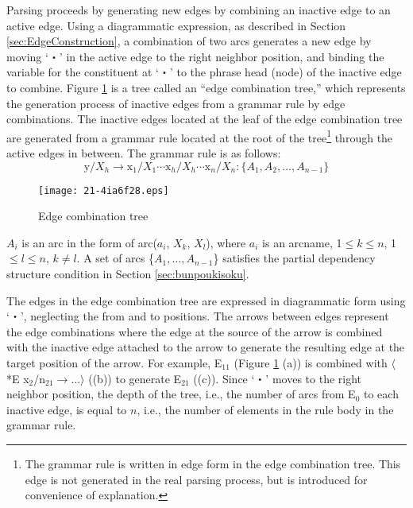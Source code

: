\documentclass[english]{jnlp_1.4_rep}
\theoremstyle{break}
\theoremstyle{plain}
\theoremstyle{plain}
\begin{document}
Parsing proceeds by generating new edges by combining an inactive edge
to an active edge. Using a diagrammatic expression, as described in
Section \ref{sec:EdgeConstruction}, a combination of two arcs
generates a new edge by moving `・' in the active edge to the right
neighbor position, and binding the variable for the constituent at `・'
to the phrase head (node) of the inactive edge to
combine. Figure \ref{fig:EdgeCombinationTree} is a tree called an ``edge
combination tree,'' which represents the generation process of
inactive edges from a grammar rule by edge combinations. The inactive
edges located at the leaf of the edge combination tree are generated
from a grammar rule located at the root of the tree\footnote{The
  grammar rule is written in edge form in the edge combination
  tree. This edge is not generated in the real parsing process, but is
  introduced for convenience of explanation.} through the active edges
in between. The grammar rule is as follows:
\[
\mathrm{y}/X_h \rightarrow \mathrm{x}_1/X_1 \cdots \mathrm{x}_h/X_h \cdots \mathrm{x}_n/X_n : \{A_1, A_2, \ldots, A_{n-1}\}
\]

\begin{figure}[b]
 \begin{center}
\texttt{[image: 21-4ia6f28.eps]}
 \end{center}
\caption{Edge combination tree}
\label{fig:EdgeCombinationTree}
\end{figure}

$A_i$ is an arc in the form of arc($a_i$, $X_k$, $X_l$), where $a_i$ is
an arcname, 1${\leq}k{\leq}n$, 1${\leq}l{\leq}n$, $k{\neq}l$. A set of
arcs \{$A_1, \ldots, A_{n-1}$\} satisfies the partial dependency
structure condition in Section \ref{sec:bunpoukisoku}.

The edges in the edge combination tree are expressed in diagrammatic
form using `・', neglecting the from and to positions. The arrows
between edges represent the edge combinations where the edge at the
source of the arrow is combined with the inactive edge attached to the
arrow to generate the resulting edge at the target position of the
arrow. For example, E$_{11}$ (Figure \ref{fig:EdgeCombinationTree} (a))
is combined with $\langle$*E x$_2$/n$_{21} \rightarrow \ldots \rangle$
((b)) to generate E$_{21}$ ((c)). Since `・' moves to the right
neighbor position, the depth of the tree, i.e., the number of arcs
from E$_0$ to each inactive edge, is equal to $n$, i.e., the number of
elements in the rule body in the grammar rule.
\end{document}
